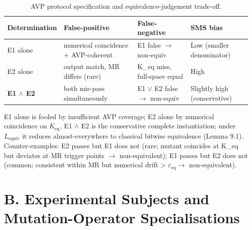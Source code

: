 \documentclass[manuscript,screen,review]{acmart}
\begin{document}
{%
\begin{longtable}[]{@{}
  >{\raggedright\arraybackslash}p{}
  >{\raggedright\arraybackslash}p{}
  >{\raggedright\arraybackslash}p{}
  >{\raggedright\arraybackslash}p{}@{}}
\caption{AVP protocol specification and equivalence-judgement trade-off.}\label{tab:p2-16}\\
\toprule\noalign{}
\begin{minipage}[b]{\linewidth}\raggedright
Determination
\end{minipage} & \begin{minipage}[b]{\linewidth}\raggedright
False-positive
\end{minipage} & \begin{minipage}[b]{\linewidth}\raggedright
False-negative
\end{minipage} & \begin{minipage}[b]{\linewidth}\raggedright
SMS bias
\end{minipage} \\
\midrule\noalign{}
\endfirsthead
\endhead
\bottomrule\noalign{}
\endlastfoot
E1 alone & numerical coincidence + AVP-coherent & E1 false $\to$ non-equiv &
Low (smaller denominator) \\
E2 alone & output match, MR differs (rare) & K\_eq miss, full-space
equal & High \\
\textbf{E1 $\wedge$ E2} & both mis-pass simultaneously & E1 $\vee$ E2 false $\to$ non-equiv
& Slightly high (conservative) \\
\end{longtable}
}

E1 alone is fooled by insufficient AVP coverage; E2 alone by numerical
coincidence on $K_{\mathrm{eq}}$. E1 $\wedge$ E2 is the conservative complete
instantiation; under $L_{\mathrm{equiv}}$ it reduces almost-everywhere to
classical bitwise equivalence (Lemma 9.1). Counter-examples: E2 passes
but E1 does not (rare; mutant coincides at K\_eq but deviates at MR
trigger points $\to$ non-equivalent); E1 passes but E2 does not (common;
consistent within MR but numerical drift \textgreater{} $\varepsilon_{\mathrm{eq}} \to$
non-equivalent).


\section{B. Experimental Subjects and Mutation-Operator Specialisations}\label{b.-experimental-subjects-and-mutation-operator-specialisations}
\end{document}
